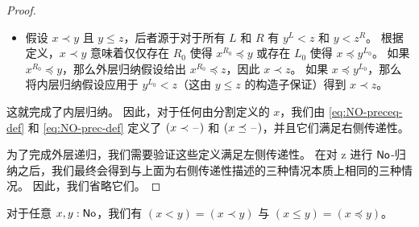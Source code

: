 \begin{proof}
\begin{itemize}
    其次，假设 $y<z$ 源于 $y^{R_0}\le z$。
    那么根据定义，$x\preceq y$ 意味着 $x\prec y^{R_0}$，然后将内层归纳假设应用于 $y^{R_0}\le z$，得到 $x\prec z$。
  \item 假设 $x\prec y$ 且 $y\le z$，后者源于对于所有 $L$ 和 $R$ 有 $y^L<z$ 和 $y<z^R$。
    根据定义，$x\prec y$ 意味着仅仅存在 $R_0$ 使得 $x^{R_0}\preceq y$ 或存在 $L_0$ 使得 $x\preceq y^{L_0}$。
    如果 $x^{R_0}\preceq y$，那么外层归纳假设给出 $x^{R_0}\preceq z$，因此 $x\prec z$。
    如果 $x\preceq y^{L_0}$，那么将内层归纳假设应用于 $y^{L_0}<z$（这由 $y\le z$ 的构造子保证）得到 $x\prec z$。

  \end{itemize}
  这就完成了内层归纳。
  因此，对于任何由分割定义的 $x$，我们由 \eqref{eq:NO-preceq-def} 和 \eqref{eq:NO-prec-def} 定义了 $(x\prec \mathord{\hspace{1pt}\text{--}\hspace{1pt}})$ 和 $(x\preceq \mathord{\hspace{1pt}\text{--}\hspace{1pt}})$，并且它们满足右侧传递性。

  为了完成外层递归，我们需要验证这些定义满足左侧传递性。
  在对 z 进行 $\mathsf{No}$-归纳之后，我们最终会得到与上面为右侧传递性描述的三种情况本质上相同的三种情况。
  因此，我们省略它们。
\end{proof}

\begin{thm}\label{thm:NO-encode-decode}
  对于任意 $x,y:\mathsf{No}$，我们有 $(x<y)=(x\prec y)$ 与 $(x\le y)=(x\preceq y)$。
\end{thm}

